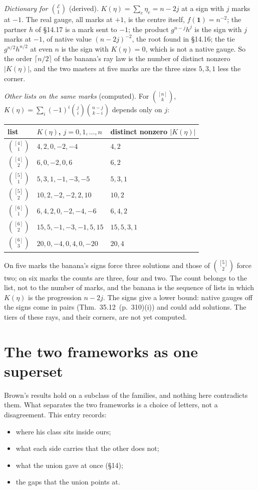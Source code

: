 \documentclass[11pt]{article}
\newcommand{\cE}{\mathcal E}
\newcommand{\one}{\mathbf 1}
\newcommand{\hb}[2]{#1~(p.~#2)}   %
\theoremstyle{plain}
\theoremstyle{remark}
\begin{document}
\emph{Dictionary for $\binom{\cE}1$} (derived). $K(\eta)=\sum_e\eta_e=n-2j$ at a sign with $j$ marks at $-1$. The real gauge, all marks at $+1$, is the centre itself, $f(\one)=n^{-2}$; the partner $h$ of \S14.17 is a mark sent to $-1$; the product $g^{n-j}h^j$ is the sign with $j$ marks at $-1$, of native value $(n-2j)^{-2}$, the root found in \S14.16; the tie $g^{n/2}h^{n/2}$ at even $n$ is the sign with $K(\eta)=0$, which is not a native gauge. So the order $\lceil n/2\rceil$ of the banana's ray law is the number of distinct nonzero $|K(\eta)|$, and the two masters at five marks are the three sizes $5,3,1$ less the corner.

\emph{Other lists on the same marks} (computed). For $\binom{[n]}k$, $K(\eta)=\sum_i(-1)^i\binom ji\binom{n-j}{k-i}$ depends only on $j$:
\begin{center}
\begin{tabular}{lll}
list & $K(\eta)$, $j=0,1,\dots,n$ & distinct nonzero $|K(\eta)|$\\\hline
$\binom{[4]}1$ & $4,2,0,-2,-4$ & $4,2$\\
$\binom{[4]}2$ & $6,0,-2,0,6$ & $6,2$\\
$\binom{[5]}1$ & $5,3,1,-1,-3,-5$ & $5,3,1$\\
$\binom{[5]}2$ & $10,2,-2,-2,2,10$ & $10,2$\\
$\binom{[6]}1$ & $6,4,2,0,-2,-4,-6$ & $6,4,2$\\
$\binom{[6]}2$ & $15,5,-1,-3,-1,5,15$ & $15,5,3,1$\\
$\binom{[6]}3$ & $20,0,-4,0,4,0,-20$ & $20,4$
\end{tabular}
\end{center}
On five marks the banana's signs force three solutions and those of $\binom{[5]}2$ force two; on six marks the counts are three, four and two. The count belongs to the list, not to the number of marks, and the banana is the sequence of lists in which $K(\eta)$ is the progression $n-2j$. The signs give a lower bound: native gauges off the signs come in pairs (Thm.~\hb{35.12}{310}(i)) and could add solutions. The tiers of these rays, and their corners, are not yet computed.

\section{The two frameworks as one superset}

Brown's results hold on a subclass of the families, and nothing here contradicts them. What separates the two frameworks is a choice of letters, not a disagreement. This entry records:
\begin{itemize}
\item where his class sits inside ours;
\item what each side carries that the other does not;
\item what the union gave at once (\S14);
\item the gaps that the union points at.
\end{itemize}
\end{document}
